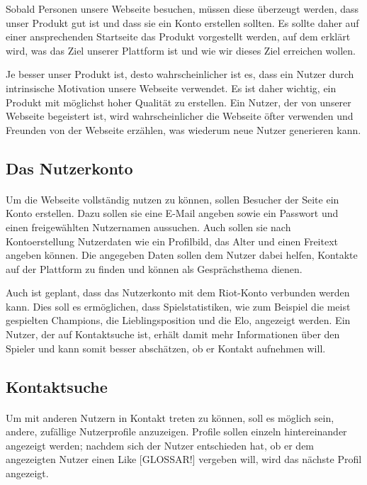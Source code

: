 Sobald Personen unsere Webseite besuchen, müssen diese überzeugt werden, dass unser Produkt gut ist und dass sie ein Konto erstellen sollten. Es sollte daher auf einer ansprechenden Startseite das Produkt vorgestellt werden, auf dem erklärt wird, was das Ziel unserer Plattform ist und wie wir dieses Ziel erreichen wollen.

Je besser unser Produkt ist, desto wahrscheinlicher ist es, dass ein Nutzer durch intrinsische Motivation unsere Webseite verwendet. Es ist daher wichtig, ein Produkt mit möglichst hoher Qualität zu erstellen. Ein Nutzer, der von unserer Webseite begeistert ist, wird wahrscheinlicher die Webseite öfter verwenden und Freunden von der Webseite erzählen, was wiederum neue Nutzer generieren kann.

\subsection{Das Nutzerkonto}
\paragraph{}
Um die Webseite vollständig nutzen zu können, sollen Besucher der Seite ein Konto erstellen. Dazu sollen sie eine E-Mail angeben sowie ein Passwort und einen freigewählten Nutzernamen aussuchen. Auch sollen sie nach Kontoerstellung Nutzerdaten wie ein Profilbild, das Alter und einen Freitext angeben können. Die angegeben Daten sollen dem Nutzer dabei helfen, Kontakte auf der Plattform zu finden und können als Gesprächsthema dienen.

Auch ist geplant, dass das Nutzerkonto mit dem Riot-Konto verbunden werden kann. Dies soll es ermöglichen, dass Spielstatistiken, wie zum Beispiel die meist gespielten Champions, die Lieblingsposition und die Elo, angezeigt werden. Ein Nutzer, der auf Kontaktsuche ist, erhält damit mehr Informationen über den Spieler und kann somit besser abschätzen, ob er Kontakt aufnehmen will. 

\subsection{Kontaktsuche}
\paragraph{}
Um mit anderen Nutzern in Kontakt treten zu können, soll es möglich sein, andere, zufällige Nutzerprofile anzuzeigen. Profile sollen einzeln hintereinander angezeigt werden; nachdem sich der Nutzer entschieden hat, ob er dem angezeigten Nutzer einen Like [GLOSSAR!] vergeben will, wird das nächste Profil angezeigt.

